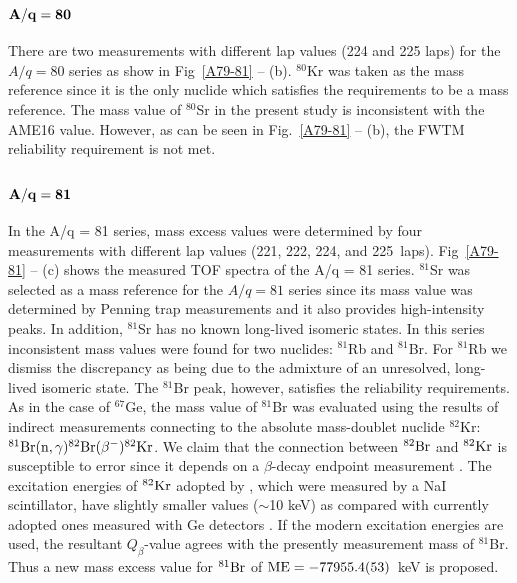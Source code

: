\documentclass[3p]{elsarticle}
\begin{document}
\subsection{${\bf A/q = 80}$}
There are two measurements with different lap values (224 and 225 laps) for the $A/q=80$ series as show in Fig~\ref{A79-81} -- (b).  $^{80}$Kr was taken as the mass reference since it is the only nuclide which satisfies the requirements to be a mass reference. The mass value of $^{80}$Sr in the present study is inconsistent with the AME16 value. However, as can be seen in Fig.~\ref{A79-81} -- (b), the FWTM reliability requirement is not met. 

\subsection{${\bf A/q = 81}$}
In the A/q = 81 series, mass excess values were determined by four measurements with different lap values (221, 222, 224, and 225~laps). Fig~\ref{A79-81} -- (c) shows the measured TOF spectra of the A/q = 81 series. $^{81}$Sr was selected as a mass reference for the $A/q=81$ series since its mass value was determined by Penning trap measurements \citep{Otto1994,Haettner2011} and it also provides high-intensity peaks. In addition, $^{81}$Sr has no known long-lived isomeric states. In this series inconsistent mass values were found for two nuclides: $^{81}$Rb and $^{81}$Br. For $^{81}$Rb we dismiss the discrepancy as being due to the admixture of an unresolved, long-lived isomeric state. The $^{81}$Br peak, however, satisfies the reliability requirements.  As in the case of $^{67}$Ge, the mass value of $^{81}$Br was evaluated using the results of indirect measurements connecting to the absolute mass-doublet nuclide $^{82}$Kr: $^{81}{\rm Br}({\rm n},\gamma) ^{82}{\rm Br} (\beta^{-}) ^{82}{\rm Kr}$. We claim that the connection between $^{82}{\rm Br}$ and $^{82}{\rm Kr}$ is susceptible to error since it depends on a $\beta$-decay endpoint measurement \citep{Waddell1956}.   The excitation energies of $^{82}{\rm Kr}$ adopted by \citep{Waddell1956}, which were measured by a NaI scintillator, have slightly smaller values ($\sim$10 keV) as compared with currently adopted ones measured with Ge detectors \citep{Tuli2003}.  If the modern excitation energies are used, the resultant $Q_{\beta}$-value agrees with the presently measurement mass of $^{81}$Br. Thus a new mass excess value for $^{81}{\rm Br}$ of ${\rm ME} = -77955.4(53)$~keV is proposed. 
\end{document}
